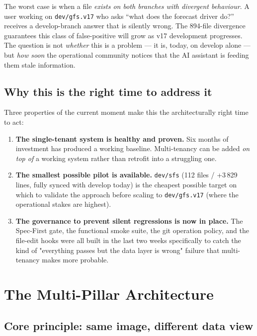 \documentclass[11pt,letterpaper]{article}
\begin{document}
The worst case is when a file \emph{exists on both branches with
divergent behaviour}. A user working on \texttt{dev/gfs.v17} who asks
``what does the forecast driver do?'' receives a develop-branch
answer that is silently wrong. The 894-file divergence guarantees this
class of false-positive will grow as v17 development progresses. The
question is not \emph{whether} this is a problem --- it is, today, on
develop alone --- but \emph{how soon} the operational community
notices that the AI assistant is feeding them stale information.

\subsection{Why this is the right time to address it}

Three properties of the current moment make this the architecturally
right time to act:

\begin{enumerate}[leftmargin=*]
    \item \textbf{The single-tenant system is healthy and proven.}
    Six months of investment has produced a working baseline.
    Multi-tenancy can be added \emph{on top of} a working system
    rather than retrofit into a struggling one.
    \item \textbf{The smallest possible pilot is available.}
    \texttt{dev/sfs} (112 files / +3\,829 lines, fully synced with
    develop today) is the cheapest possible target on which to
    validate the approach before scaling to \texttt{dev/gfs.v17}
    (where the operational stakes are highest).
    \item \textbf{The governance to prevent silent regressions
    is now in place.} The Spec-First gate, the functional smoke
    suite, the git operation policy, and the file-edit hooks were
    all built in the last two weeks specifically to catch the kind
    of "everything passes but the data layer is wrong" failure that
    multi-tenancy makes more probable.
\end{enumerate}

\section{The Multi-Pillar Architecture}

\subsection{Core principle: same image, different data view}
\end{document}
